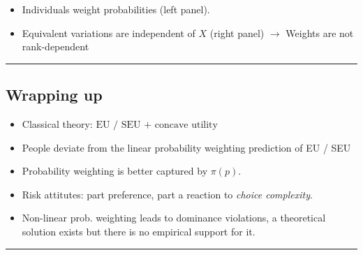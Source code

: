 \documentclass[
  letterpaper,
  DIV=11,
  numbers=noendperiod]{scrartcl}
\providecommand{\tightlist}{%
  \setlength{\itemsep}{0pt}\setlength{\parskip}{0pt}}\usepackage{longtable,booktabs,array}
\begin{document}
\begin{itemize}
\tightlist
\item
  Individuals weight probabilities (left panel).
\item
  Equivalent variations are independent of \(X\) (right panel)
  \(\rightarrow\) Weights are not rank-dependent
\end{itemize}

\begin{center}\rule{0.5\linewidth}{0.5pt}\end{center}

\subsection{Wrapping up}\label{wrapping-up}

\begin{itemize}
\tightlist
\item
  Classical theory: \(\text{EU / SEU + concave utility}\)
\item
  People deviate from the linear probability weighting prediction of EU
  / SEU
\item
  Probability weighting is better captured by \(\pi(p).\)
\item
  Risk attitutes: part preference, part a reaction to \emph{choice
  complexity}.
\item
  Non-linear prob. weighting leads to dominance violations, a
  theoretical solution exists but there is no empirical support for it.
\end{itemize}

\begin{center}\rule{0.5\linewidth}{0.5pt}\end{center}
\end{document}
